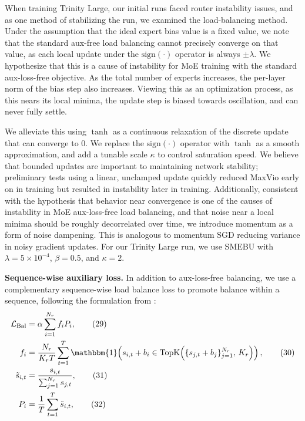 \documentclass{article}
\begin{document}
When training Trinity Large, our initial runs faced router instability issues, and as one method of stabilizing the run, we examined the load-balancing method. Under the assumption that the ideal expert bias value is a fixed value, we note that the standard aux-free load balancing cannot precisely converge on that value, as each local update under the $\mathrm{sign}(\cdot)$ operator is always $\pm \lambda$. We hypothesize that this is a cause of instability for MoE training with the standard aux-loss-free objective. As the total number of experts increases, the per-layer norm of the bias step also increases. Viewing this as an optimization process, as this nears its local minima, the update step is biased towards oscillation, and can never fully settle.

We alleviate this using $\tanh$ as a continuous relaxation of the discrete update that can converge to 0. We replace the $\mathrm{sign}(\cdot)$ operator with $\tanh$ as a smooth approximation, and add a tunable scale $\kappa$ to control saturation speed. We believe that bounded updates are important to maintaining network stability; preliminary tests using a linear, unclamped update quickly reduced MaxVio early on in training but resulted in instability later in training. Additionally, consistent with the hypothesis that behavior near convergence is one of the causes of instability in MoE aux-loss-free load balancing, and that noise near a local minima should be roughly decorrelated over time, we introduce momentum as a form of noise dampening. This is analogous to momentum SGD reducing variance in noisy gradient updates.
For our Trinity Large run, we use SMEBU with $\lambda = 5\times10^{-4}$, $\beta = 0.5$, and $\kappa = 2$.

\newpage
\noindent\textbf{Sequence-wise auxiliary loss.}
In addition to aux-loss-free balancing, we use a complementary sequence-wise load balance loss to promote balance within a sequence, following the formulation from \cite{deepseekai2025deepseekv3technicalreport}:
\begin{align}
\mathcal{L}_{\mathrm{Bal}}
&=
\alpha \sum_{i=1}^{N_r} f_i P_i,
\tag{29}\\
f_i
&=
\frac{N_r}{K_r T}\sum_{t=1}^{T}
\mathbbm{1}\!\left(
s_{i,t}+b_i \in \mathrm{TopK}\!\left(\{s_{j,t}+b_j\}_{j=1}^{N_r},\,K_r\right)
\right),
\tag{30}\\
\tilde{s}_{i,t}
&=
\frac{s_{i,t}}{\sum_{j=1}^{N_r} s_{j,t}},
\tag{31}\\
P_i
&=
\frac{1}{T}\sum_{t=1}^{T}\tilde{s}_{i,t},
\tag{32}
\end{align}
\end{document}

